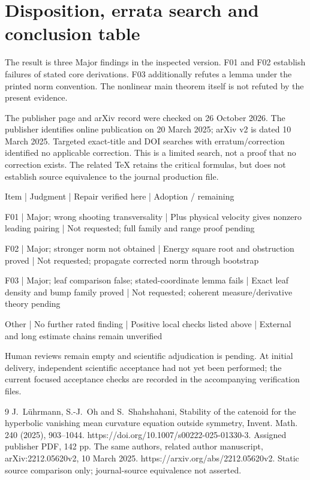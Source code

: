 \documentclass[10pt]{article}
\begin{document}
\section*{Disposition, errata search and conclusion table}
The result is three Major findings in the inspected version. F01 and F02 establish failures of stated core derivations. F03 additionally refutes a lemma under the printed norm convention. The nonlinear main theorem itself is not refuted by the present evidence.\par
The publisher page and arXiv record were checked on 26 October 2026. The publisher identifies online publication on 20 March 2025; arXiv v2 is dated 10 March 2025. Targeted exact-title and DOI searches with erratum/correction identified no applicable correction. This is a limited search, not a proof that no correction exists. The related TeX retains the critical formulas, but does not establish source equivalence to the journal production file.\par
Item | Judgment | Repair verified here | Adoption / remaining\par
F01 | Major; wrong shooting transversality | Plus physical velocity gives nonzero leading pairing | Not requested; full family and range proof pending\par
F02 | Major; stronger norm not obtained | Energy square root and obstruction proved | Not requested; propagate corrected norm through bootstrap\par
F03 | Major; leaf comparison false; stated-coordinate lemma fails | Exact leaf density and bump family proved | Not requested; coherent measure/derivative theory pending\par
Other | No further rated finding | Positive local checks listed above | External and long estimate chains remain unverified\par
Human reviews remain empty and scientific adjudication is pending. At initial delivery, independent scientific acceptance had not yet been performed; the current focused acceptance checks are recorded in the accompanying verification files.\par
9 J. Lührmann, S.-J. Oh and S. Shahshahani, Stability of the catenoid for the hyperbolic vanishing mean curvature equation outside symmetry, Invent. Math. 240 (2025), 903–1044. https://doi.org/10.1007/s00222-025-01330-3. Assigned publisher PDF, 142 pp. The same authors, related author manuscript, arXiv:2212.05620v2, 10 March 2025. https://arxiv.org/abs/2212.05620v2. Static source comparison only; journal-source equivalence not asserted.\par
\end{document}
